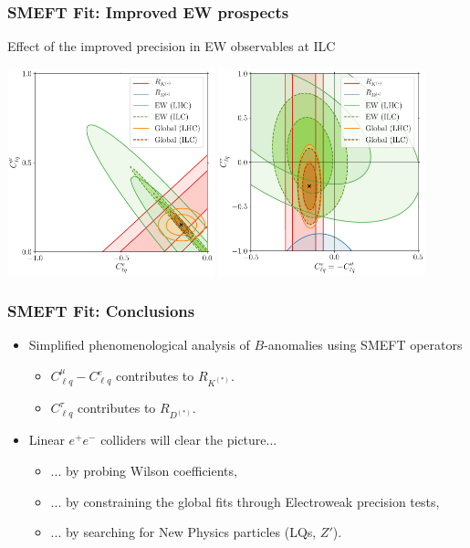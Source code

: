 \documentclass[mathserif, 10pt]{beamer}
\begin{document}
\begin{frame}\frametitle{SMEFT Fit: Improved EW prospects}

    Effect of the improved precision in EW observables at ILC
    \begin{center}
        \includegraphics[width=0.45\textwidth]{figures/scIV_ILC.pdf}
        \includegraphics[width=0.45\textwidth]{figures/scXI_ILC.pdf}
    \end{center}

\end{frame}

\begin{frame}\frametitle{SMEFT Fit: Conclusions}

    \begin{itemize}
        \item Simplified phenomenological analysis of $B$-anomalies using SMEFT operators
              \begin{itemize}
                  \item $C_{\ell q}^\mu-C_{\ell q}^e$ contributes to  $R_{K^{(*)}}$.
                  \item $C_{\ell q}^\tau$ contributes to  $R_{D^{(*)}}$.
              \end{itemize}
        \item Linear $e^+ e^-$ colliders will clear the picture...
              \begin{itemize}
                  \item ... by probing Wilson coefficients,
                  \item ... by constraining the global fits through Electroweak precision tests,
                  \item ... by searching for New Physics particles (LQs, $Z'$).
              \end{itemize}
    \end{itemize}

\end{frame}
\end{document}

